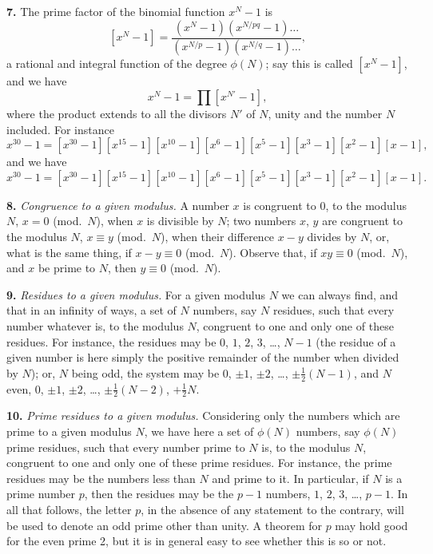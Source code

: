 \documentclass[11pt,a4paper]{article}
\begin{document}
\textbf{7.}\quad
The prime factor of the binomial function $x^{N} - 1$ is
\[
[x^{N} - 1] = \frac{(x^{N} - 1)(x^{N/pq} - 1) \ldots}{(x^{N/p} - 1)(x^{N/q} - 1) \ldots},
\]
a rational and integral function of the degree $\phi(N)$; say this is called $[x^{N} - 1]$, and we have
\[
x^{N} - 1 = \prod [x^{N'} - 1],
\]
where the product extends to all the divisors $N'$ of $N$, unity and the number $N$ included. For instance
\[
x^{30} - 1 = [x^{30} - 1][x^{15} - 1][x^{10} - 1][x^{6} - 1][x^{5} - 1][x^{3} - 1][x^{2} - 1][x - 1],
\]
and we have
\[
x^{30} - 1 = [x^{30} - 1][x^{15} - 1][x^{10} - 1][x^{6} - 1][x^{5} - 1][x^{3} - 1][x^{2} - 1][x - 1].
\]

\textbf{8.}\quad
\textit{Congruence to a given modulus.} A number $x$ is congruent to 0, to the modulus $N$, $x = 0$ (mod.\ $N$), when $x$ is divisible by $N$; two numbers $x$, $y$ are congruent to the modulus $N$, $x \equiv y$ (mod.\ $N$), when their difference $x - y$ divides by $N$, or, what is the same thing, if $x - y \equiv 0$ (mod.\ $N$). Observe that, if $xy \equiv 0$ (mod.\ $N$), and $x$ be prime to $N$, then $y \equiv 0$ (mod.\ $N$).

\textbf{9.}\quad
\textit{Residues to a given modulus.} For a given modulus $N$ we can always find, and that in an infinity of ways, a set of $N$ numbers, say $N$ residues, such that every number whatever is, to the modulus $N$, congruent to one and only one of these residues. For instance, the residues may be $0$, $1$, $2$, $3$, \ldots, $N - 1$ (the residue of a given number is here simply the positive remainder of the number when divided by $N$); or, $N$ being odd, the system may be $0$, $\pm 1$, $\pm 2$, \ldots, $\pm \frac{1}{2}(N - 1)$, and $N$ even, $0$, $\pm 1$, $\pm 2$, \ldots, $\pm \frac{1}{2}(N - 2)$, $+\frac{1}{2}N$.

\textbf{10.}\quad
\textit{Prime residues to a given modulus.} Considering only the numbers which are prime to a given modulus $N$, we have here a set of $\phi(N)$ numbers, say $\phi(N)$ prime residues, such that every number prime to $N$ is, to the modulus $N$, congruent to one and only one of these prime residues. For instance, the prime residues may be the numbers less than $N$ and prime to it. In particular, if $N$ is a prime number $p$, then the residues may be the $p - 1$ numbers, $1$, $2$, $3$, \ldots, $p - 1$. In all that follows, the letter $p$, in the absence of any statement to the contrary, will be used to denote an odd prime other than unity. A theorem for $p$ may hold good for the even prime 2, but it is in general easy to see whether this is so or not.
\end{document}
